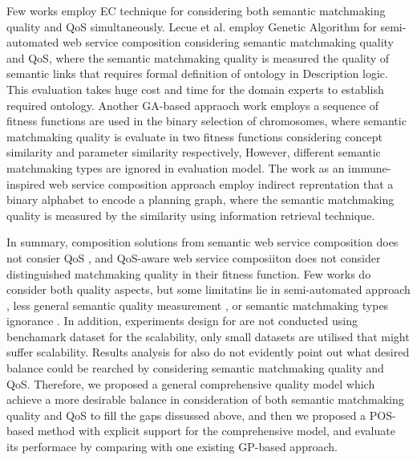 \documentclass{IEEEtran}
\begin{document}
Few works \cite{lecue2009optimizing,fanjiang2014semantic,pop2009immune} employ EC technique for considering both semantic matchmaking quality and QoS simultaneously. Lecue et al. \cite{lecue2009optimizing} employ Genetic Algorithm for semi-automated web service composition considering semantic matchmaking quality and QoS, where the semantic matchmaking quality is measured the quality of semantic links that requires formal definition of ontology in Description logic. This evaluation takes huge cost and time for the domain experts to establish required ontology. Another GA-based appraoch work \cite{fanjiang2014semantic} employs a sequence of fitness functions are used in the binary selection of chromosomes, where semantic matchmaking quality is evaluate in two fitness functions considering concept similarity and parameter similarity respectively, However, different semantic matchmaking types are ignored in evaluation model. The work \cite{pop2009immune} as an immune-inspired web service composition approach employ indirect reprentation that a binary alphabet to encode a planning graph, where the semantic matchmaking quality is measured  by the similarity using information retrieval technique.


In summary, composition solutions from semantic web service composition does not consier QoS \cite{boustil2014semantic,mier2015integrated, bansal2016generalized}, and QoS-aware web service composiiton \cite{da2016particle,da2015graphevol,yu2013adaptive, gupta2015optimization,qi2010combining} does not consider distinguished matchmaking quality in their fitness function. Few works do consider both quality aspects, but some limitatins lie in semi-automated approach \cite{lecue2009optimizing}, less general semantic quality measurement \cite{lecue2009optimizing, pop2009immune}, or semantic matchmaking types ignorance \cite{pop2009immune}. In addition, experiments design for  \cite{lecue2009optimizing,fanjiang2014semantic,pop2009immune} are not conducted using benchamark dataset for the scalability, only small datasets are utilised that might suffer scalability. Results analysis for \cite{lecue2009optimizing,fanjiang2014semantic,pop2009immune} also do not evidently point out what desired balance could be rearched by considering semantic matchmaking quality and QoS. Therefore, we proposed a general comprehensive quality model which achieve a more desirable balance in consideration of both semantic matchmaking quality and QoS to fill the gaps dissussed above, and then we proposed a POS-based method with explicit support for the comprehensive model, and evaluate its performace by comparing with one existing GP-based approach.
\end{document}
